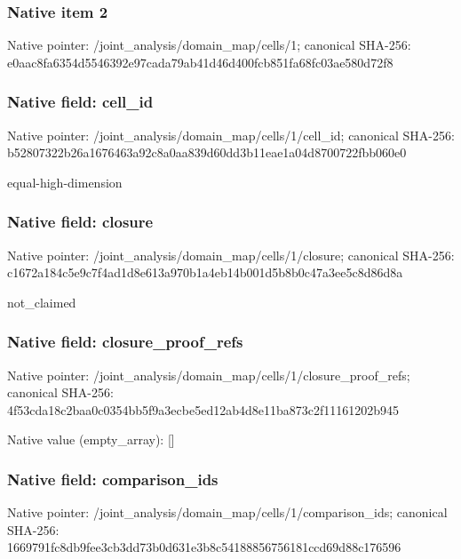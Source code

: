 \documentclass[10pt,a4paper]{article}
\begin{document}
\subsubsection{Native item 2}
Native pointer: /joint\_\allowbreak{}analysis/domain\_\allowbreak{}map/cells/1; canonical SHA-256: e0aac8fa6354d5546392e97cada79ab41d46d400fcb851fa68fc03ae580d72f8

\subsubsection{Native field: cell\_\allowbreak{}id}
Native pointer: /joint\_\allowbreak{}analysis/domain\_\allowbreak{}map/cells/1/cell\_\allowbreak{}id; canonical SHA-256: b52807322b26a1676463a92c8a0aa839d60dd3b11eae1a04d8700722fbb060e0

\begingroup\raggedright\sloppy equal-high-dimension\par\endgroup

\subsubsection{Native field: closure}
Native pointer: /joint\_\allowbreak{}analysis/domain\_\allowbreak{}map/cells/1/closure; canonical SHA-256: c1672a184c5e9c7f4ad1d8e613a970b1a4eb14b001d5b8b0c47a3ee5c8d86d8a

\begingroup\raggedright\sloppy not\_\allowbreak{}claimed\par\endgroup

\subsubsection{Native field: closure\_\allowbreak{}proof\_\allowbreak{}refs}
Native pointer: /joint\_\allowbreak{}analysis/domain\_\allowbreak{}map/cells/1/closure\_\allowbreak{}proof\_\allowbreak{}refs; canonical SHA-256: 4f53cda18c2baa0c0354bb5f9a3ecbe5ed12ab4d8e11ba873c2f11161202b945

Native value (empty\_\allowbreak{}array): []

\subsubsection{Native field: comparison\_\allowbreak{}ids}
Native pointer: /joint\_\allowbreak{}analysis/domain\_\allowbreak{}map/cells/1/comparison\_\allowbreak{}ids; canonical SHA-256: 1669791fc8db9fee3cb3dd73b0d631e3b8c54188856756181ccd69d88c176596
\end{document}
